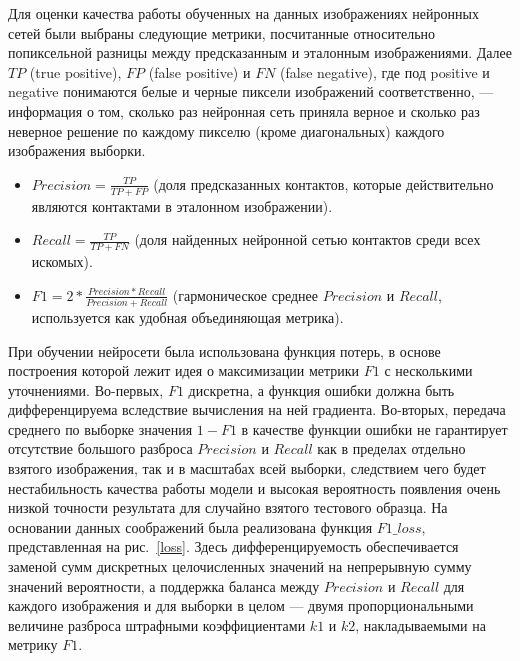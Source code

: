 Для оценки качества работы обученных на данных изображениях нейронных сетей были выбраны следующие метрики, посчитанные относительно попиксельной разницы между предсказанным и эталонным изображениями. Далее $TP$ (true positive), $FP$ (false positive) и $FN$ (false negative), где под positive и negative  понимаются белые и черные пиксели изображений соответственно, --- информация о том, сколько раз нейронная сеть приняла верное и сколько раз неверное решение по каждому пикселю (кроме диагональных) каждого изображения выборки.
\begin{itemize} 
    \item $Precision = \frac{TP}{TP + FP}$ (доля предсказанных контактов, которые действительно являются контактами в эталонном изображении).
    \item $Recall = \frac{TP}{TP + FN}$ (доля найденных нейронной сетью контактов среди всех искомых).
    \item $F1 = 2 * \frac{Precision * Recall}{Precision + Recall}$ (гармоническое среднее $Precision$ и $Recall$, используется как удобная объединяющая метрика).
\end{itemize}

При обучении нейросети была использована функция потерь, в основе построения которой лежит идея о максимизации метрики $F1$ с несколькими уточнениями. Во-первых, $F1$ дискретна, а функция ошибки должна быть дифференцируема вследствие вычисления на ней градиента. Во-вторых, передача среднего по выборке значения $1 - F1$ в качестве функции ошибки не гарантирует отсутствие большого разброса $Precision$ и $Recall$ как в пределах отдельно взятого изображения, так и в масштабах всей выборки, следствием чего будет нестабильность качества работы модели и высокая вероятность появления очень низкой точности результата для случайно взятого тестового образца. На основании данных соображений была реализована функция $F1\_loss$, представленная на рис.~\ref{loss}. Здесь дифференцируемость обеспечивается заменой сумм дискретных целочисленных значений на непрерывную сумму значений вероятности, а поддержка баланса между $Precision$ и $Recall$ для каждого изображения и для выборки в целом --- двумя пропорциональными величине разброса штрафными коэффициентами $k1$ и $k2$, накладываемыми на метрику $F1$.

